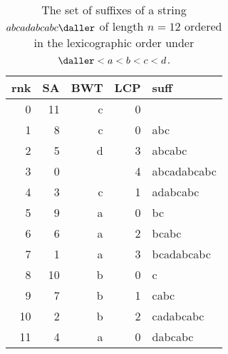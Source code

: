 \begin{table}[t]
\caption{
  The set of suffixes of a string $abcadabcabc\daller$ of length $n=12$ ordered in the lexicographic order under $\daller < a < b < c < d$. 
}
\ttfamily
\begin{tabular}{rr{2cm}rrl}
\toprule
rnk	& SA	& BWT	& LCP	& suff \\
\midrule
0	& 11	& c	& 0	& \daller \\
1	& 8	& c	& 0	& abc\daller \\
2	& 5	& d	& 3	& abcabc\daller \\
3	& 0	& \daller	& 4	& abcadabcabc\daller \\
4	& 3	& c	& 1	& adabcabc\daller \\
5	& 9	& a	& 0	& bc\daller \\
6	& 6	& a	& 2	& bcabc\daller \\
7	& 1	& a	& 3	& bcadabcabc\daller \\
8	& 10	& b	& 0	& c\daller \\
9	& 7	& b	& 1	& cabc\daller \\
10	& 2	& b	& 2	& cadabcabc\daller \\
11	& 4	& a	& 0	& dabcabc\daller \\
\bottomrule
\end{tabular}
\end{table}

